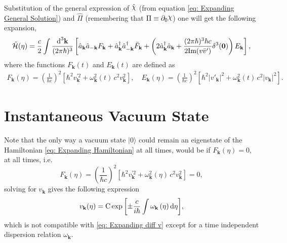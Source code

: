 Substitution of the general expression of $\hat{\rchi}$ (from equation \ref{eq: Expanding General Solution}) and $\hat{\Pi}$ (remembering that $\Pi\equiv\partial_0\rchi$) one will get the following expansion,
\begin{equation}\label{eq: Expanding Hamiltonian}
	\hat{\mathcal{H}}(\eta)=\frac{c}{2}\int\frac{\text{d}^3\mathbf{k}}{(2\pi\hbar)^3}\left[\hat{a}_\mathbf{k}\hat{a}_{-\mathbf{k}}F_\mathbf{k}+\hat{a}^\dagger_\mathbf{k}\hat{a}^\dagger_{-\mathbf{k}}\bar F_\mathbf{k}+\left(2\hat{a}_\mathbf{k}^\dagger\hat{a}_\mathbf{k}+\frac{(2\pi\hbar)^3\hbar c}{2\text{Im}(v\bar v')}\delta^3(\mathbf{0})\right)E_\mathbf{k}\right],
\end{equation}
where the functions $F_\mathbf{k}(t)$ and $E_\mathbf{k}(t)$ are defined as
\begin{subequations}
	\begin{gather}
		F_\mathbf{k}(\eta)=\left(\frac{1}{\hbar c}\right)^2\left[\hbar^2v^{'2}_\mathbf{k}+\omega^2_\mathbf{k}(t)\,c^2 v_\mathbf{k}^2\right],\quad E_\mathbf{k}(\eta)=\left(\frac{1}{\hbar c}\right)^2\left[\hbar^2\big|v'_\mathbf{k}\big|^2+\omega^2_\mathbf{k}(t)\,c^2 \big|v_\mathbf{k}\big|^2\right].\tag{\theequation \,\,a,b}
	\end{gather}
\end{subequations}
\section{Instantaneous Vacuum State}
Note that the only way a vacuum state $|0\rangle$ could remain an eigenstate of the Hamiltonian \ref{eq: Expanding Hamiltonian} at all times, would be if $F_\mathbf{k}(\eta)=0$, at all times, i.e.
\begin{equation}
	F_\mathbf{k}(\eta)=\left(\frac{1}{\hbar c}\right)^2\left[\hbar^2v^{'2}_\mathbf{k}+\omega^2_\mathbf{k}(\eta)\,c^2 v_\mathbf{k}^2\right]=0,
\end{equation}
solving for $v_\mathbf{k}$ gives the following expression
\begin{equation}
	v_\mathbf{k}(\eta)=\text{C}\exp{\left[\pm \frac{c}{i\hbar}\int\omega_\mathbf{k}\left(\eta\right)\text{d}\eta\right]},
\end{equation}
which is not compatible with \ref{eq: Expanding diff v} except for a time independent dispersion relation $\omega_\mathbf{k}$.

